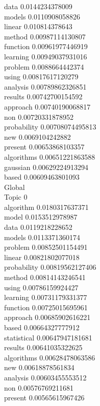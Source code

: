 \documentclass{article}
\begin{document}
{data 0.0144234378009\\
models 0.0110908058826\\
linear 0.010814378643\\
method 0.00987114130807\\
function 0.00961977446919\\
learning 0.00949037931016\\
problem 0.0088664442374\\
using 0.00817617120279\\
analysis 0.00789862326851\\
results 0.00742700154592\\
approach 0.00740190068817\\
non 0.00720331878952\\
probability 0.00708074495813\\
new 0.0069104242882\\
present 0.00653868103357\\
algorithms 0.00651221863588\\
gaussian 0.00629224913294\\
based 0.00609463801093\\
Global\\
Topic 0\\
algorithm 0.0180317637371\\
model 0.0153512978987\\
data 0.0119218228652\\
models 0.0113371360174\\
problem 0.00852501154491\\
linear 0.00821802077018\\
probability 0.00819562127406\\
method 0.00814143246541\\
using 0.00786159924427\\
learning 0.00731179331377\\
function 0.00725015695961\\
approach 0.00685902616221\\
based 0.00664327777912\\
statistical 0.00647947181681\\
results 0.00641035322625\\
algorithms 0.00628478063586\\
new 0.00618878561834\\
analysis 0.00603455553512\\
non 0.00576769211681\\
present 0.00565615967426\\

}
\end{document}
